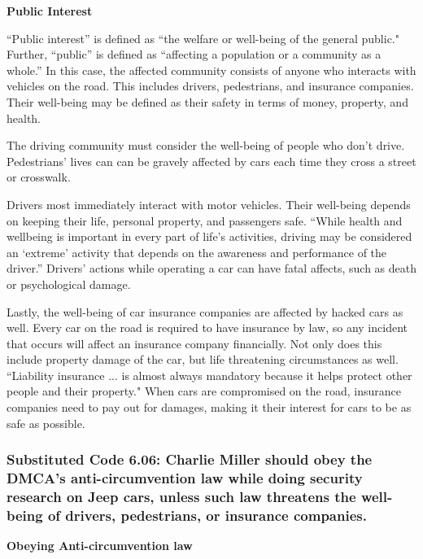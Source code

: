 \documentclass[12pt]{article}
\begin{document}
\begin{multicols}{2}
\vspace{.5cm}\hspace{-.5cm}\textbf{Public Interest}\vspace{.2cm}

``Public interest'' is defined as ``the welfare or well-being of the general public."\cite{dictionary} Further, ``public'' is defined as ``affecting a population or a community as a whole.''\cite{dictionary} In this case, the affected community consists of anyone who interacts with vehicles on the road. This includes drivers, pedestrians, and insurance companies. Their well-being may be defined as their safety in terms of money, property, and health.

The driving community must consider the well-being of people who don't drive. Pedestrians' lives can can be gravely affected by cars each time they cross a street or crosswalk. 

Drivers most immediately interact with motor vehicles. Their well-being depends on keeping their life, personal property, and passengers safe. ``While health and wellbeing is important in every part of life’s activities, driving may be considered an ‘extreme’ activity that depends on the awareness and performance of the driver.''\cite{driverWellBeing} Drivers' actions while operating a car can have fatal affects, such as death or psychological damage.

Lastly, the well-being of car insurance companies are affected by hacked cars as well. Every car on the road is required to have insurance by law,\cite{insurance} so any incident that occurs will affect an insurance company financially. Not only does this include property damage of the car, but life threatening circumstances as well. ``Liability insurance ... is almost always mandatory because it helps protect other people and their property."\cite{insurance} When cars are compromised on the road, insurance companies need to pay out for damages, making it their interest for cars to be as safe as possible.

\subsubsection{Substituted Code 6.06: Charlie Miller should obey the DMCA's anti-circumvention law while doing security research on Jeep cars, unless such law threatens the well-being of drivers, pedestrians, or insurance companies.}

\textbf{Obeying Anti-circumvention law }\vspace{.2cm}


\end{multicols}
\end{document}

